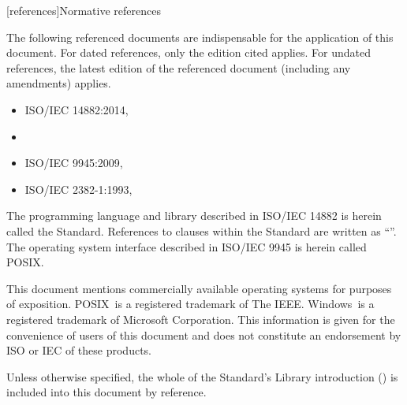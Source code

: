 
[references]{Normative references}

\pnum
The following referenced documents are indispensable for the application of this document. For dated references, only the edition cited applies. For undated references, the latest edition of the referenced document (including any amendments) applies.



\begin{itemize}
\item ISO/IEC 14882:2014, 
\item {}
\item ISO/IEC 9945:2009, 
\item ISO/IEC 2382-1:1993, 
\end{itemize}

\pnum
The programming language and library described in ISO/IEC 14882 is herein called the \Cpp Standard.
References to clauses within the \Cpp Standard are written as ``''.
The operating system interface described in ISO/IEC 9945 is herein called POSIX.

\pnum
This document mentions commercially available operating systems for purposes of exposition.  POSIX\textregistered\ is a registered trademark of The IEEE. Windows\textregistered\ is a registered trademark of Microsoft Corporation. This information is given for the convenience of users of this document and does not constitute an endorsement by ISO or IEC of these products.

\pnum
Unless otherwise specified, the whole of the \Cpp Standard's Library introduction () is included into this document by reference.


